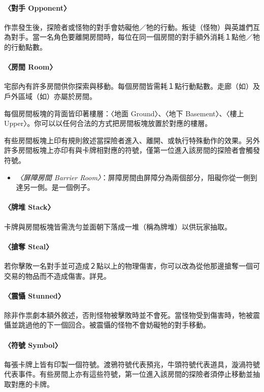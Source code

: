 \paragraph{〈對手 Opponent〉}
作祟發生後，探險者或怪物的對手會妨礙他／牠的行動。叛徒（怪物）與英雄們互為對手。當一名角色要離開房間時，每位在同一個房間的對手額外消耗１點他／牠的行動點數。

\paragraph{〈房間 Room〉}
宅邸內有許多房間供你探索與移動。每個房間皆需耗１點行動點數。走廊（如）及戶外區域（如）亦屬於房間。

每個房間板塊的背面皆印著樓層：〈地面 Ground〉、〈地下 Basement〉、〈樓上 Upper〉。你可以以任何合法的方式把房間板塊放置於對應的樓層。

有些房間板塊上印有規則敘述當探險者進入、離開、或執行特殊動作的效果。另外許多房間板塊上亦印有與卡牌相對應的符號，僅第一位進入該房間的探險者會觸發符號。

\begin{itemize}
	\item \textit{〈屏障房間 Barrier Room〉}：屏障房間由屏障分為兩個部分，阻礙你從一側到達另一側。是一個例子。
\end{itemize}

\paragraph{〈牌堆 Stack〉}
卡牌與房間板塊皆需洗勻並面朝下落成一堆（稱為牌堆）以供玩家抽取。

\paragraph{〈搶奪 Steal〉}
若你擊敗一名對手並可造成２點以上的物理傷害，你可以改為從他那邊搶奪一個可交易的物品而不造成傷害。詳見。

\paragraph{〈震懾 Stunned〉}
除非作祟劇本額外敘述，否則怪物被擊敗時並不會死。當怪物受到傷害時，牠被震懾並跳過他的下一個回合。被震懾的怪物不會妨礙牠的對手移動。

\paragraph{〈符號 Symbol〉}
每張卡牌上皆有印製一個符號。渡鴉符號\OmenSymbol{}代表預兆，牛頭符號\ItemSymbol{}代表道具，漩渦符號\EventSymbol{}代表事件。有些房間上亦有這些符號，第一位進入該房間的探險者須停止移動並抽取對應的卡牌。

